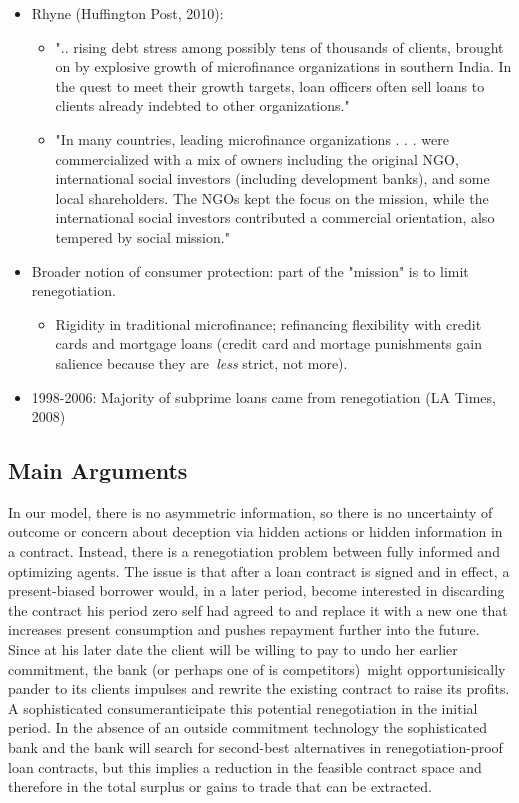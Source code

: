 \documentclass[11pt]{article}%
\begin{document}
\begin{itemize}
\item Rhyne (Huffington Post, 2010):

\begin{itemize}
\item ".. rising debt stress among possibly tens of thousands of clients,
brought on by explosive growth of microfinance organizations in southern
India. In the quest to meet their growth targets, loan officers often sell
loans to clients already indebted to other organizations."

\item "In many countries, leading microfinance organizations . . . were
commercialized with a mix of owners including the original NGO, international
social investors (including development banks), and some local shareholders.
The NGOs kept the focus on the mission, while the international social
investors contributed a commercial orientation, also tempered by social mission."
\end{itemize}

\item Broader notion of consumer protection: part of the "mission" is to limit renegotiation.

\begin{itemize}
\item Rigidity in traditional microfinance; refinancing flexibility with
credit cards and mortgage loans (credit card and mortage punishments gain
salience because they are\textit{\ less} strict, not more).
\end{itemize}

\item 1998-2006: Majority of subprime loans came from renegotiation (LA Times, 2008)
\end{itemize}

\subsection{Main Arguments}

In our model, there is no asymmetric information, so there is no uncertainty
of outcome or concern about deception via hidden actions or hidden information
in a contract. Instead, there is a renegotiation problem between fully
informed and optimizing agents. The issue is that after a loan contract is
signed and in effect, a present-biased borrower would, in a later period,
become interested in discarding the contract his period zero self had agreed
to and replace it with a new one that increases present consumption and pushes
repayment further into the future. Since at his later date the client will be
willing to pay to undo her earlier commitment, the bank (or perhaps one of is
competitors)\ might opportunisically pander to its clients impulses and
rewrite the existing contract to raise its profits. A sophisticated
consumeranticipate this potential renegotiation in the initial period. In the
absence of an outside commitment technology the sophisticated bank and the
bank will search for second-best alternatives in renegotiation-proof loan
contracts, but this implies a reduction in the feasible contract space and
therefore in the total surplus or gains to trade that can be extracted. \ 
\end{document}
